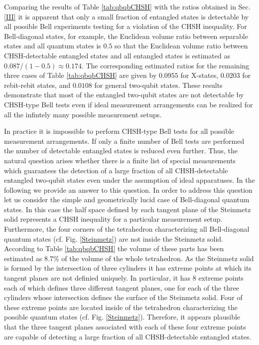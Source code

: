 \documentclass[12pt]{iopart}
\begin{document}
Comparing the results of Table \ref{tab:qbqbCHSH} with the ratios obtained in Sec.\ref{III} it is apparent that only a small fraction of entangled states is detectable by all possible Bell experiments testing 
for a violation of the CHSH inequality. For Bell-diagonal states, for example, the Euclidean volume ratio between separable states and all quantum states is $0.5$ so that the Euclidean volume ratio between 
CHSH-detectable entangled states and all entangled states is estimated as $0.087/(1-0.5)\approx 0.174$.
The corresponding estimated ratios for
the remaining three cases of 
Table \ref{tab:qbqbCHSH} 
are given by $0.0955$ for X-states, $0.0203$ for rebit-rebit states, and $0.0108$ for general two-qubit states. These results demonstrate that most of the entangled two-qubit states are not detectable 
by CHSH-type Bell tests even if ideal measurement arrangements can be realized for all the infintely many possible measurement setups.

In practice it is impossible to perform CHSH-type Bell tests for all possible measurement arrangements. If only a finite number of Bell tests are performed the number of detectable entangled states is reduced even 
further. Thus, the natural question arises whether there is a finite list of special measurements which guarantees the detection of a large fraction of all CHSH-detectable entangled two-qubit states 
even under the assumption of ideal apparatuses. In the following we provide an answer to this question.  
In order to address this question
let us consider the simple and geometrically lucid case of Bell-diagonal quantum states. In this case the half space defined by each tangent plane of the Steinmetz solid represents a CHSH inequality for a 
particular measurement setup. 
Furthermore, the four corners of the tetrahedron characterizing all Bell-diagonal quantum states (cf.  Fig. \ref{Steinmetz}) are not inside the Steinmetz solid.
According to Table \ref{tab:qbqbCHSH}
the volume of these parts has been estimated as $8.7 \%$ of the volume of the whole tetrahedron. 
As the Steinmetz solid is formed by the intersection of three cylinders it has extreme points at which its tangent planes are not definied uniquely. In particular, it has $8$ extreme
points each of which defines three different tangent planes, one for each of the three cylinders whose intersection defines the surface of the Steinmetz solid. 
Four of these extreme points are located inside of the tetrahedron characterizing the possible quantum states (cf.  Fig. \ref{Steinmetz}). 
Therefore, it appears plausible that the three tangent planes associated with each of these four extreme points 
are capable of detecting a large fraction of all CHSH-detectable entangled states.
\end{document}
